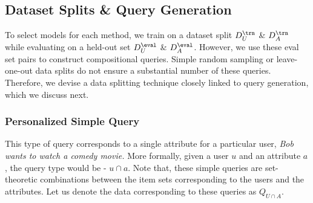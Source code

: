 \subsection{Dataset Splits  \& Query Generation}
To select models for each method, we train on a dataset split $D_U^\trn$ \& $D_A^\trn$ while evaluating on a held-out set $D_U^\eval$ \& $D_A^\eval$. However, we use these eval set pairs to construct compositional queries. Simple random sampling or leave-one-out data splits do not ensure a substantial number of these queries. Therefore, we devise a data splitting technique closely linked to query generation, which we discuss next.
 
\subsubsection{Personalized Simple Query}
\label{sec:simple_query} This type of query corresponds to a single attribute for a particular user, \eg \textit{Bob wants to watch a comedy movie.} More formally, given a user $u$ and an attribute $a$, the query type would be - $u \cap a$.  Note that, these simple queries are set-theoretic combinations between the item sets corresponding to the users and the attributes. Let us denote the data corresponding to these queries as $Q_{U \cap A}$.

